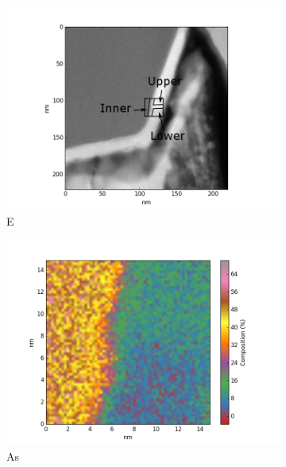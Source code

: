\begin{figure}
	\centering
		\begin{subfigure}{0.5\textwidth}
		\includegraphics[width=\textwidth]{fig/q/D-E/E}
		\caption{E}
		\label{fig:E-overview}
	\end{subfigure}%
	\hfill
	\begin{subfigure}{0.45\textwidth}
		\includegraphics[width=\textwidth]{fig/q-new/E/oldzeta/As_zeta}
		\caption{As}
		\label{fig:Eas}
	\end{subfigure}
	\centering
	\begin{subfigure}{0.45\textwidth}

\end{subfigure}
\end{figure}
